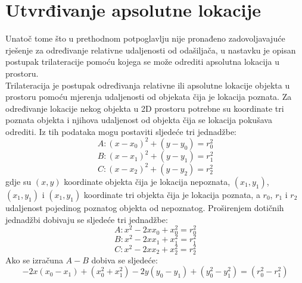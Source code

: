 \section{Utvrđivanje apsolutne lokacije}

Unatoč tome što u prethodnom potpoglavlju nije pronađeno zadovoljavajuće rješenje za određivanje relativne udaljenosti od odašiljača, u nastavku je opisan postupak trilateracije pomoću kojega se može odrediti apsolutna lokacija u prostoru.
\\

Trilateracija je postupak određivanja relativne ili apsolutne lokacije objekta u prostoru pomoću mjerenja udaljenosti od objekata čija je lokacija poznata. 
Za određivanje lokacije nekog objekta u 2D prostoru potrebne su koordinate tri poznata objekta i njihova udaljenost od objekta čija se lokacija pokušava odrediti. 
Iz tih podataka mogu postaviti sljedeće tri jednadžbe:
\begin{equation}
    A: (x-x_0)^2 + (y-y_0)=r_0^2
\end{equation}
\begin{equation}
    B: (x-x_1)^2 + (y-y_1)=r_1^2
\end{equation}
\begin{equation}
    C: (x-x_2)^2 + (y-y_2)=r_2^2
\end{equation}
gdje su $(x,y)$ koordinate objekta čija je lokacija nepoznata, $(x_1,y_1)$, $(x_1,y_1)$ i $(x_1,y_1)$ koordinate tri objekta čija je lokacija poznata, a $r_0$, $r_1$ i $r_2$ udaljenost pojedinog poznatog objekta od nepoznatog. 
Proširenjem dotičnih jednadžbi dobivaju se sljedeće tri jednadžbe:
\begin{equation}
    A: x^2 - 2xx_0 + x_0^2=r_0^2
\end{equation}
\begin{equation}
    B: x^2 - 2xx_1 + x_1^2=r_1^2
\end{equation}
\begin{equation}
    C: x^2 - 2xx_2 + x_2^2=r_2^2
\end{equation}
Ako se izračuna $A-B$ dobiva se sljedeće:
\begin{equation}
    -2x(x_0 - x_1) + (x_0^2 + x_1^2) - 2y(y_0 - y_1) + (y_0^2 - y_1^2) = (r_0^2 - r_1^2)
\end{equation}
